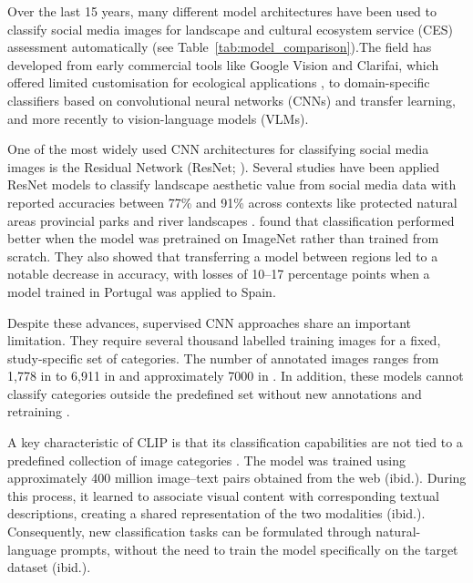 \documentclass[11pt]{article}
\renewcommand{\_}{\textunderscore\allowbreak{}}
\begin{document}
Over the last 15 years, many different model architectures have been used to classify social media images for landscape and cultural ecosystem service (CES) assessment automatically (see Table~\ref{tab:model_comparison}).The field has developed from early commercial tools like Google Vision and Clarifai, which offered limited customisation for ecological applications \citep{lingua_valuing_2022,winder_open-source_2022}, to domain-specific classifiers based on convolutional neural networks (CNNs) and transfer learning, and more recently to vision-language models (VLMs).

One of the most widely used CNN architectures for classifying social media images is the Residual Network (ResNet; \citealt{he_deep_2016}). Several studies have been applied ResNet models to classify landscape aesthetic value from social media data with reported accuracies between 77\% and 91\% across contexts like protected natural areas \citet{cardoso_classifying_2022} provincial parks \citet{lingua_valuing_2022} and river landscapes \citet{comalada_modelling_2025}. \citet{cardoso_classifying_2022} found that classification performed better when the model was pretrained on ImageNet rather than trained from scratch. They also showed that transferring a model between regions led to a notable decrease in accuracy, with losses of 10--17 percentage points when a model trained in Portugal was applied to Spain.

Despite these advances, supervised CNN approaches share an important limitation. They require several thousand labelled training images for a fixed, study-specific set of categories. The number of annotated images ranges from 1,778 in \citet{cardoso_classifying_2022} to 6,911 in \citet{comalada_modelling_2025} and approximately 7000 in \citet{lingua_valuing_2022}. In addition, these models cannot classify categories outside the predefined set without new annotations and retraining \citep{radford_learning_2021}.

A key characteristic of CLIP is that its classification capabilities are not tied to a predefined collection of image categories \citep{radford_learning_2021}. The model was trained using approximately 400 million image--text pairs obtained from the web (ibid.). During this process, it learned to associate visual content with corresponding textual descriptions, creating a shared representation of the two modalities (ibid.). Consequently, new classification tasks can be formulated through natural-language prompts, without the need to train the model specifically on the target dataset (ibid.).
\end{document}
